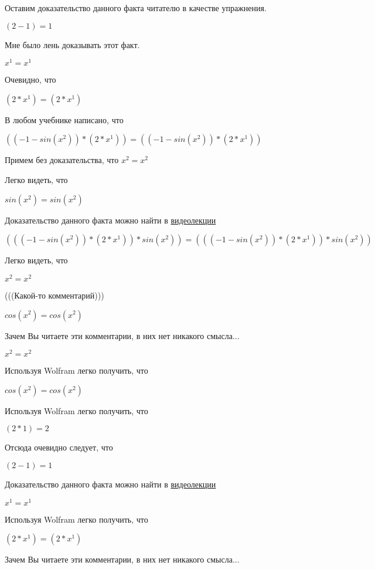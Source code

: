 \documentclass[12pt,a4paper,fleqn]{article}
\theoremstyle{definition}
\begin{document}
Оставим доказательство данного факта читателю в качестве упражнения.

$( 2  -  1 ) =  1 $

Мне было лень доказывать этот факт.

${ x }^{ 1 } = { x }^{ 1 }$

Очевидно, что

$( 2  * { x }^{ 1 }) = ( 2  * { x }^{ 1 })$

В любом учебнике написано, что

$(( -1  - sin({ x }^{ 2 })) * ( 2  * { x }^{ 1 })) = (( -1  - sin({ x }^{ 2 })) * ( 2  * { x }^{ 1 }))$

Примем без доказательства, что
${ x }^{ 2 } = { x }^{ 2 }$

Легко видеть, что

$sin({ x }^{ 2 }) = sin({ x }^{ 2 })$

Доказательство данного факта можно найти в \href{https://www.youtube.com/watch?v=dQw4w9WgXcQ}{видеолекции}

$((( -1  - sin({ x }^{ 2 })) * ( 2  * { x }^{ 1 })) * sin({ x }^{ 2 })) = ((( -1  - sin({ x }^{ 2 })) * ( 2  * { x }^{ 1 })) * sin({ x }^{ 2 }))$

Легко видеть, что

${ x }^{ 2 } = { x }^{ 2 }$

(((Какой-то комментарий)))

$cos({ x }^{ 2 }) = cos({ x }^{ 2 })$

Зачем Вы читаете эти комментарии, в них нет никакого смысла...

${ x }^{ 2 } = { x }^{ 2 }$

Используя Wolfram легко получить, что

$cos({ x }^{ 2 }) = cos({ x }^{ 2 })$

Используя Wolfram легко получить, что

$( 2  *  1 ) =  2 $

Отсюда очевидно следует, что

$( 2  -  1 ) =  1 $

Доказательство данного факта можно найти в \href{https://www.youtube.com/watch?v=dQw4w9WgXcQ}{видеолекции}

${ x }^{ 1 } = { x }^{ 1 }$

Используя Wolfram легко получить, что

$( 2  * { x }^{ 1 }) = ( 2  * { x }^{ 1 })$

Зачем Вы читаете эти комментарии, в них нет никакого смысла...
\end{document}
